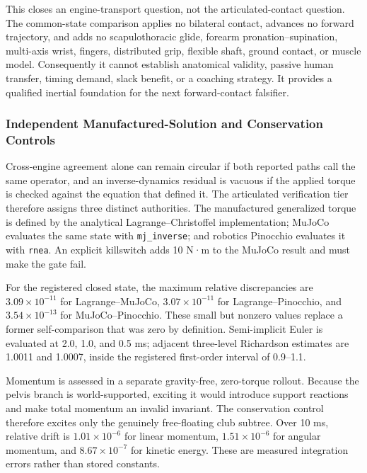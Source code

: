 \documentclass[
  letterpaper,
]{report}
\begin{document}
This closes an engine-transport question, not the articulated-contact
question. The common-state comparison applies no bilateral contact,
advances no forward trajectory, and adds no scapulothoracic glide,
forearm pronation--supination, multi-axis wrist, fingers, distributed
grip, flexible shaft, ground contact, or muscle model. Consequently it
cannot establish anatomical validity, passive human transfer, timing
demand, slack benefit, or a coaching strategy. It provides a qualified
inertial foundation for the next forward-contact falsifier.

\subsubsection{Independent Manufactured-Solution and Conservation
Controls}\label{independent-manufactured-solution-and-conservation-controls}

Cross-engine agreement alone can remain circular if both reported paths
call the same operator, and an inverse-dynamics residual is vacuous if
the applied torque is checked against the equation that defined it. The
articulated verification tier therefore assigns three distinct
authorities. The manufactured generalized torque is defined by the
analytical Lagrange--Christoffel implementation; MuJoCo evaluates the
same state with \texttt{mj\_inverse}; and robotics Pinocchio evaluates
it with \texttt{rnea}. An explicit killswitch adds 10 N·m to the MuJoCo
result and must make the gate fail.

For the registered closed state, the maximum relative discrepancies are
\(3.09\times10^{-11}\) for Lagrange--MuJoCo, \(3.07\times10^{-11}\) for
Lagrange--Pinocchio, and \(3.54\times10^{-13}\) for MuJoCo--Pinocchio.
These small but nonzero values replace a former self-comparison that was
zero by definition. Semi-implicit Euler is evaluated at 2.0, 1.0, and
0.5 ms; adjacent three-level Richardson estimates are 1.0011 and 1.0007,
inside the registered first-order interval of 0.9--1.1.

Momentum is assessed in a separate gravity-free, zero-torque rollout.
Because the pelvis branch is world-supported, exciting it would
introduce support reactions and make total momentum an invalid
invariant. The conservation control therefore excites only the genuinely
free-floating club subtree. Over 10 ms, relative drift is
\(1.01\times10^{-6}\) for linear momentum, \(1.51\times10^{-6}\) for
angular momentum, and \(8.67\times10^{-7}\) for kinetic energy. These
are measured integration errors rather than stored constants.
\end{document}
